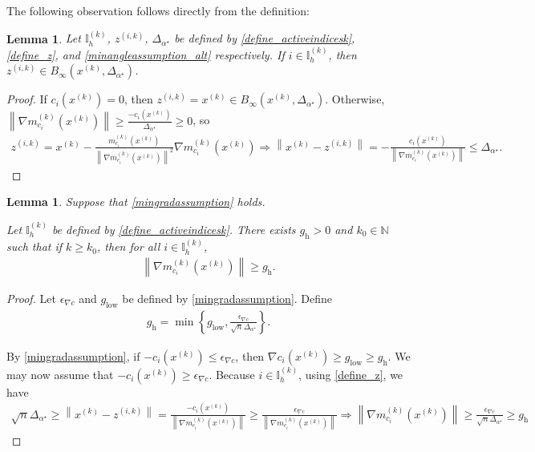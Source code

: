 \documentclass{article}
\newtheorem{lemma}[theorem]{Lemma}
\theoremstyle{case}
\numberwithin{theorem}{subsection}
\newcommand{\gmcik}{{\nabla m_{c_i}^{(k)}\left(\xk\right)}}
\newcommand{\minangledelta}{{\Delta_{\alpha^{\star}}}}
\newcommand{\mingradepsilon}{{\epsilon_{\nabla c}}}
\newcommand{\mingrad}{{ g_{\textrm{low}} }}
\newcommand{\naturals}{\mathbb N}
\newcommand{\xk}{x^{(k)}}
\newcommand{\zik}{{z^{(i, k)}}}
\newcommand{\activeindicesk}{{ \mathbb I_h^{(k)} }}
\newcommand{\activegradmin}{{ g_{\textrm{h}} }}
\begin{document}
The following observation follows directly from the definition:
\begin{lemma}
\label{doesntreallyneedtobesaid}
Let $\activeindicesk$, $\zik$, $\minangledelta$ be defined by \cref{define_activeindicesk}, \cref{define_z}, and \cref{minangleassumption_alt} respectively.
If $i \in \activeindicesk$, then $\zik \in B_{\infty}\left(\xk, \minangledelta \right)$.
\end{lemma}
\begin{proof}
If $c_i\left(\xk\right) = 0$, then $\zik = \xk \in B_{\infty}\left(\xk, \minangledelta \right)$.
Otherwise, $\left\|\gmcik\right\| \ge \frac{-c_i\left(\xk\right)}{\minangledelta} \ge 0$, so
\begin{align*}
\zik = \xk - \frac{m^{(k)}_{c_i}\left(\xk\right)}{\left\|\gmcik\right\|^2} \gmcik 
\Longrightarrow \left\|\xk - \zik \right\|= -\frac{c_i\left(\xk\right)}{\left\|\gmcik\right\|} \le \minangledelta.
\end{align*}
\end{proof}

\begin{lemma}
\label{underbound}
Suppose that \cref{mingradassumption} holds.

Let $\activeindicesk$ be defined by \cref{define_activeindicesk}.
There exists $\activegradmin > 0$ and $k_0 \in \naturals$ such that if $k \ge k_0$, then
for all $i \in \activeindicesk$,
\begin{align*}
\left\|\gmcik\right\| \ge \activegradmin.
\end{align*}
\end{lemma}
\begin{proof}

Let $\mingradepsilon$ and $\mingrad$ be defined by \cref{mingradassumption}.
Define
\begin{align}
\label{define_activegradmin}
\activegradmin = \min\left\{\mingrad, \frac{\mingradepsilon}{\sqrt{n} \minangledelta}\right\}.
\end{align}

By \cref{mingradassumption}, if $-c_i\left(\xk\right) \le \mingradepsilon$, then $\nabla c_i\left(\xk\right) \ge \mingrad \ge \activegradmin$.
We may now assume that $-c_i\left(\xk\right) \ge \mingradepsilon$.
Because $i \in \activeindicesk$, using \cref{define_z}, we have
\begin{align*}
\sqrt{n} \minangledelta \ge \left\|\xk - \zik \right\|
= \frac{-c_i\left(\xk\right)}{\left\|\gmcik\right\|}
\ge \frac{\mingradepsilon}{\left\|\gmcik\right\|}
\Longrightarrow
\left\|\gmcik\right\| \ge \frac{\mingradepsilon}{\sqrt{n} \minangledelta} \ge \activegradmin
\end{align*}
\end{proof}
\end{document}
